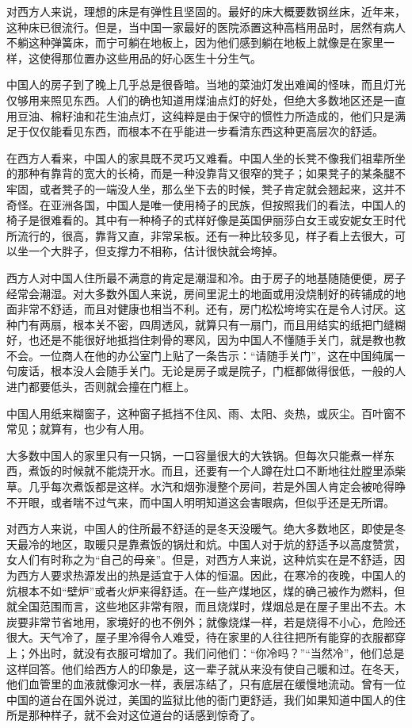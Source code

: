 \documentclass[12pt,oneside]{book}
\begin{document}
\begin{common-format}
对西方人来说，理想的床是有弹性且坚固的。最好的床大概要数钢丝床，近年来，这种床已很流行。但是，当中国一家最好的医院添置这种高档用品时，居然有病人不躺这种弹簧床，而宁可躺在地板上，因为他们感到躺在地板上就像是在家里一样，这使得那位置办这些用品的好心医生十分生气。 

中国人的房子到了晚上几乎总是很昏暗。当地的菜油灯发出难闻的怪味，而且灯光仅够用来照见东西。人们的确也知道用煤油点灯的好处，但绝大多数地区还是一直用豆油、棉籽油和花生油点灯，这纯粹是由于保守的惯性力所造成的，他们只是满足于仅仅能看见东西，而根本不在乎能进一步看清东西这种更高层次的舒适。 

在西方人看来，中国人的家具既不灵巧又难看。中国人坐的长凳不像我们祖辈所坐的那种有靠背的宽大的长椅，而是一种没靠背又很窄的凳子；如果凳子的某条腿不牢固，或者凳子的一端没人坐，那么坐下去的时候，凳子肯定就会翘起来，这并不奇怪。在亚洲各国，中国人是唯一使用椅子的民族，但按照我们的看法，中国人的椅子是很难看的。其中有一种椅子的式样好像是英国伊丽莎白女王或安妮女王时代所流行的，很高，靠背又直，非常呆板。还有一种比较多见，样子看上去很大，可以坐一个大胖子，但支撑力不相称，估计很快就会垮掉。 

西方人对中国人住所最不满意的肯定是潮湿和冷。由于房子的地基随随便便，房子经常会潮湿。对大多数外国人来说，房间里泥土的地面或用没烧制好的砖铺成的地面非常不舒适，而且对健康也相当不利。还有，房门松松垮垮实在是令人讨厌。这种门有两扇，根本关不密，四周透风，就算只有一扇门，而且用结实的纸把门缝糊好，也还是不能很好地抵挡住刺骨的寒风，因为中国人不懂随手关门，就是教也教不会。一位商人在他的办公室门上贴了一条告示：“请随手关门”，这在中国纯属一句废话，根本没人会随手关门。无论是房子或是院子，门框都做得很低，一般的人进门都要低头，否则就会撞在门框上。 

中国人用纸来糊窗子，这种窗子抵挡不住风、雨、太阳、炎热，或灰尘。百叶窗不常见；就算有，也少有人用。 

大多数中国人的家里只有一只锅，一口容量很大的大铁锅。但每次只能煮一样东西，煮饭的时候就不能烧开水。而且，还要有一个人蹲在灶口不断地往灶膛里添柴草。几乎每次煮饭都是这样。水汽和烟弥漫整个房间，若是外国人肯定会被呛得睁不开眼，或者喘不过气来，而中国人明明知道这会害眼病，但似乎还是无所谓。 

对西方人来说，中国人的住所最不舒适的是冬天没暖气。绝大多数地区，即使是冬天最冷的地区，取暖只是靠煮饭的锅灶和炕。中国人对于炕的舒适予以高度赞赏，女人们有时称之为“自己的母亲”。但是，对西方人来说，这种炕实在是不舒适，因为西方人要求热源发出的热是适宜于人体的恒温。因此，在寒冷的夜晚，中国人的炕根本不如“壁炉”或者火炉来得舒适。在一些产煤地区，煤的确己被作为燃料，但就全国范围而言，这些地区非常有限，而且烧煤时，煤烟总是在屋子里出不去。木炭要非常节省地用，家境好的也不例外；就像烧煤一样，若是烧得不小心，危险还很大。天气冷了，屋子里冷得令人难受，待在家里的人往往把所有能穿的衣服都穿上；外出时，就没有衣服可增加了。我们问他们：“你冷吗？”“当然冷”，他们总是这样回答。他们给西方人的印象是，这一辈子就从来没有使自己暖和过。在冬天，他们血管里的血液就像河水一样，表层冻结了，只有底层在缓慢地流动。曾有一位中国的道台在国外说过，美国的监狱比他的衙门更舒适，我们如果知道中国人的住所是那种样子，就不会对这位道台的话感到惊奇了。 


\end{common-format}
\end{document}
